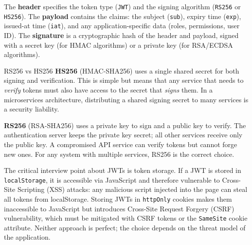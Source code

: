 \documentclass[11pt,a4paper]{article}
\begin{document}
The \textbf{header} specifies the token type (\texttt{JWT}) and the signing algorithm (\texttt{RS256} or \texttt{HS256}). The \textbf{payload} contains the claims: the subject (\texttt{sub}), expiry time (\texttt{exp}), issued-at time (\texttt{iat}), and any application-specific data (roles, permissions, user ID). The \textbf{signature} is a cryptographic hash of the header and payload, signed with a secret key (for HMAC algorithms) or a private key (for RSA/ECDSA algorithms).

\begin{termbox}{RS256 vs HS256}
\textbf{HS256} (HMAC-SHA256) uses a single shared secret for both signing and verification. This is simple but means that any service that needs to \textit{verify} tokens must also have access to the secret that \textit{signs} them. In a microservices architecture, distributing a shared signing secret to many services is a security liability.

\textbf{RS256} (RSA-SHA256) uses a private key to sign and a public key to verify. The authentication server keeps the private key secret; all other services receive only the public key. A compromised API service can verify tokens but cannot forge new ones. For any system with multiple services, RS256 is the correct choice.
\end{termbox}

The critical interview point about JWTs is token storage. If a JWT is stored in \texttt{localStorage}, it is accessible via JavaScript and therefore vulnerable to Cross-Site Scripting (XSS) attacks: any malicious script injected into the page can steal all tokens from localStorage. Storing JWTs in \texttt{httpOnly} cookies makes them inaccessible to JavaScript but introduces Cross-Site Request Forgery (CSRF) vulnerability, which must be mitigated with CSRF tokens or the \texttt{SameSite} cookie attribute. Neither approach is perfect; the choice depends on the threat model of the application.
\end{document}

